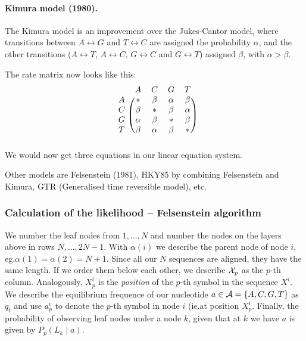 \paragraph{Kimura model (1980).}  The Kimura model is an improvement over
the Jukes-Cantor model, where transitions between \(A\leftrightarrow G\) and
\(T\leftrightarrow C\) are assigned the probability \(\alpha\), and the
other transitions (\(A\leftrightarrow T\), \(A\leftrightarrow C\),
\(G\leftrightarrow C\) and \(G\leftrightarrow T\)) assigned \(\beta\), with
\(\alpha > \beta\).

The rate matrix now looks like this:
\[
\begin{blockarray}{ccccc}
  & A      & C      & G      & T \\
\begin{block}{c(cccc)}
A & *      & \beta  & \alpha & \beta  \\
C & \beta  & *      & \beta  & \alpha \\
G & \alpha & \beta  & *      & \beta  \\
T & \beta  & \alpha & \beta & *       \\
\end{block}
\end{blockarray}
\]
We would now get three equations in our linear equation system.

Other models are Felsenstein (1981), HKY85 by combining Felsenstein and
Kimura, GTR (Generalised time reversible model), etc\@.

\subsubsection{Calculation of the likelihood -- Felsenstein algorithm}

We number the leaf nodes from \(1,\dotsc,N\) and number the nodes on the
layers above in rows \(N,\dotsc,2N-1\).  With \(\alpha(i)\) we describe the
parent node of node \(i\), eg.\@ \(\alpha(1)=\alpha(2)=N+1\).  Since all our
\(N\) sequences are aligned, they have the same length.  If we order them
below each other, we describe \(\mathcal{X}_p\) as the \(p\)-th column.  Analogously,
\(X_p^i\) is the \emph{position} of the \(p\)-th symbol in the sequence \(X^i\).
We describe the equilibrium frequence of our nucleotide
\(a\in\mathcal{A}=\{A,C,G,T\}\) as \(q_t\) and use \(a_p^i\) to denote the
\(p\)-th symbol in node \(i\) (ie.\@ at position \(X_p^i\).  Finally,
the probability of observing leaf nodes under a node \(k\), given that at \(k\)
we have \(a\) is given by \(P_p(L_k \mid a)\).

